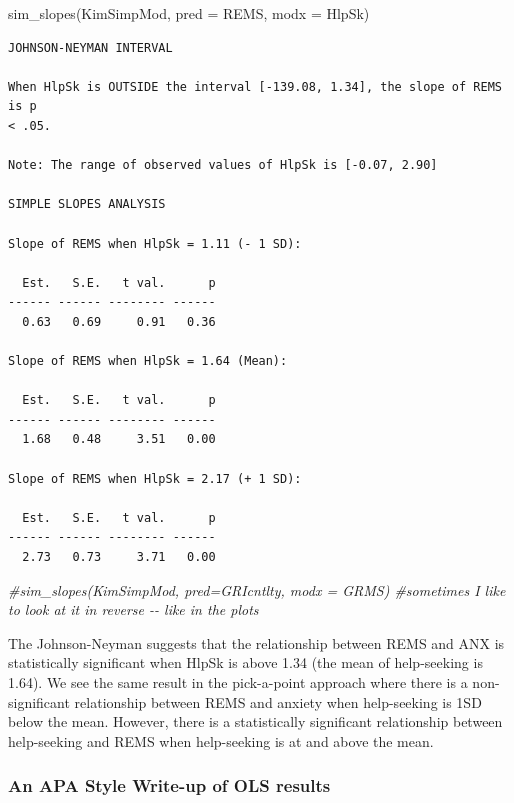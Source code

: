 \documentclass[
  english,
]{book}
\newenvironment{Shaded}{\begin{snugshade}}{\end{snugshade}}
\newcommand{\AttributeTok}[1]{\textcolor[rgb]{0.77,0.63,0.00}{#1}}
\newcommand{\CommentTok}[1]{\textcolor[rgb]{0.56,0.35,0.01}{\textit{#1}}}
\newcommand{\FunctionTok}[1]{\textcolor[rgb]{0.00,0.00,0.00}{#1}}
\newcommand{\NormalTok}[1]{#1}
\begin{document}
\begin{Shaded}
\begin{Highlighting}[]
\FunctionTok{sim\_slopes}\NormalTok{(KimSimpMod, }\AttributeTok{pred =}\NormalTok{ REMS, }\AttributeTok{modx =}\NormalTok{ HlpSk)}
\end{Highlighting}
\end{Shaded}

\begin{verbatim}
JOHNSON-NEYMAN INTERVAL 

When HlpSk is OUTSIDE the interval [-139.08, 1.34], the slope of REMS is p
< .05.

Note: The range of observed values of HlpSk is [-0.07, 2.90]

SIMPLE SLOPES ANALYSIS 

Slope of REMS when HlpSk = 1.11 (- 1 SD): 

  Est.   S.E.   t val.      p
------ ------ -------- ------
  0.63   0.69     0.91   0.36

Slope of REMS when HlpSk = 1.64 (Mean): 

  Est.   S.E.   t val.      p
------ ------ -------- ------
  1.68   0.48     3.51   0.00

Slope of REMS when HlpSk = 2.17 (+ 1 SD): 

  Est.   S.E.   t val.      p
------ ------ -------- ------
  2.73   0.73     3.71   0.00
\end{verbatim}

\begin{Shaded}
\begin{Highlighting}[]
\CommentTok{\#sim\_slopes(KimSimpMod, pred=GRIcntlty, modx = GRMS) \#sometimes I like to look at it in reverse {-}{-} like in the plots}
\end{Highlighting}
\end{Shaded}

The Johnson-Neyman suggests that the relationship between REMS and ANX is statistically significant when HlpSk is above 1.34 (the mean of help-seeking is 1.64). We see the same result in the pick-a-point approach where there is a non-significant relationship between REMS and anxiety when help-seeking is 1SD below the mean. However, there is a statistically significant relationship between help-seeking and REMS when help-seeking is at and above the mean.

\hypertarget{an-apa-style-write-up-of-ols-results}{%
\subsubsection{An APA Style Write-up of OLS results}\label{an-apa-style-write-up-of-ols-results}}
\end{document}
